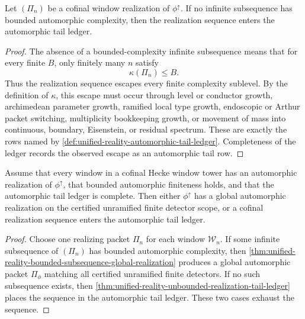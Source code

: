 \begin{theorem}
\label{thm:unified-reality-unbounded-realization-tail-ledger}
Let $(\Pi_n)$ be a cofinal window realization of
$\phi^{\uparrow}$. If no infinite subsequence has bounded automorphic
complexity, then the realization sequence enters the automorphic tail
ledger.
\end{theorem}
\begin{proof}
The absence of a bounded-complexity infinite subsequence means that for
every finite $B$, only finitely many $n$ satisfy
$$
\kappa(\Pi_n)\le B.
$$
Thus the realization sequence escapes every finite complexity sublevel.
By the definition of $\kappa$, this escape must occur through level or
conductor growth, archimedean parameter growth, ramified local type
growth, endoscopic or Arthur packet switching, multiplicity bookkeeping
growth, or movement of mass into continuous, boundary, Eisenstein, or
residual spectrum. These are exactly the rows named by
\autoref{def:unified-reality-automorphic-tail-ledger}. Completeness of
the ledger records the observed escape as an automorphic tail row.
\end{proof}

\begin{theorem}
\label{thm:unified-reality-window-global-alternative}
Assume that every window in a cofinal Hecke window tower has an
automorphic realization of $\phi^{\uparrow}$, that bounded automorphic
finiteness holds, and that the automorphic tail ledger is complete.
Then either $\phi^{\uparrow}$ has a global automorphic realization on
the certified unramified finite detector scope, or a cofinal realization
sequence enters the automorphic tail ledger.
\end{theorem}
\begin{proof}
Choose one realizing packet $\Pi_n$ for each window $\mathcal W_n$. If
some infinite subsequence of $(\Pi_n)$ has bounded automorphic
complexity, then
\autoref{thm:unified-reality-bounded-subsequence-global-realization}
produces a global automorphic packet $\Pi_{\phi}$ matching all certified
unramified finite detectors. If no such subsequence exists, then
\autoref{thm:unified-reality-unbounded-realization-tail-ledger} places
the sequence in the automorphic tail ledger. These two cases exhaust the
sequence.
\end{proof}

